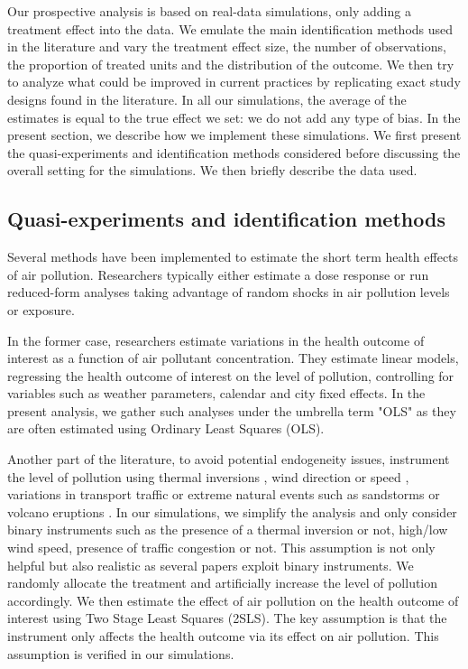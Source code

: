 \documentclass[12pt]{article}
\begin{document}
    Our prospective analysis is based on real-data simulations, only adding a treatment effect into the data. We emulate the main identification methods used in the literature and vary the treatment effect size, the number of observations, the proportion of treated units and the distribution of the outcome. We then try to analyze what could be improved in current practices by replicating exact study designs found in the literature. In all our simulations, the average of the estimates is equal to the true effect we set: we do not add any type of bias. In the present section, we describe how we implement these simulations. We first present the quasi-experiments and identification methods considered before discussing the overall setting for the simulations. We then briefly describe the data used.

    \subsection{Quasi-experiments and identification methods}
        
        Several methods have been implemented to estimate the short term health effects of air pollution. Researchers typically either estimate a dose response or run reduced-form analyses taking advantage of random shocks in air pollution levels or exposure. 
        
        In the former case, researchers estimate variations in the health outcome of interest as a function of air pollutant concentration. They estimate linear models, regressing the health outcome of interest on the level of pollution, controlling for variables such as weather parameters, calendar and city fixed effects. In the present analysis, we gather such analyses under the umbrella term "OLS" as they are often estimated using Ordinary Least Squares (OLS). 
        
        Another part of the literature, to avoid potential endogeneity issues, instrument the level of pollution using thermal inversions \citep{beard_winter_2012, arceo_does_2016, jans_economic_2018}, wind direction or speed \citep{schwartz_national_2018, deryugina_mortality_2019, isphording_pandemic_2021}, variations in transport traffic \citep{moretti_pollution_2011, knittel_caution_2016, schlenker_airports_2016} or extreme natural events such as sandstorms or volcano eruptions \citep{ebenstein_particulate_2015, halliday_vog_2019}. In our simulations, we simplify the analysis and only consider binary instruments such as the presence of a thermal inversion or not, high/low wind speed, presence of traffic congestion or not. This assumption is not only helpful but also realistic as several papers exploit binary instruments. We randomly allocate the treatment and artificially increase the level of pollution accordingly. We then estimate the effect of air pollution on the health outcome of interest using Two Stage Least Squares (2SLS). The key assumption is that the instrument only affects the health outcome via its effect on air pollution. This assumption is verified in our simulations.
        
\end{document}
